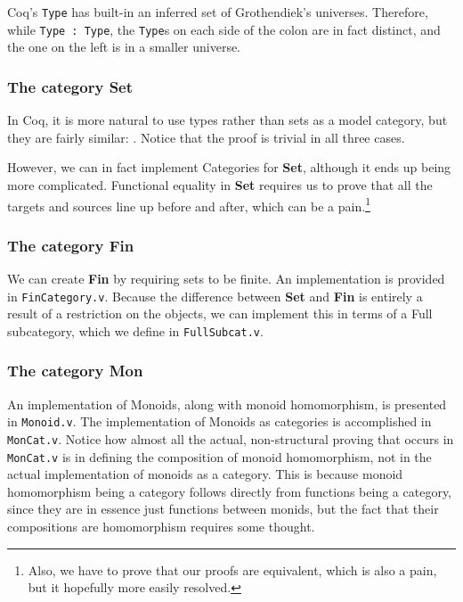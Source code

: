 \documentclass[12pt,twocolumn,oneside]{book}
\begin{document}
Coq's \texttt{Type} has built-in an inferred set of Grothendiek's universes. Therefore,
while \texttt{Type : Type}, the \texttt{Type}s on each side of the colon are in fact
distinct, and the one on the left is in a smaller universe.

\subsubsection{The category \textbf{Set}}

In Coq, it is more natural to use types rather than sets as a model category, but
they are fairly similar: . Notice that the proof
is trivial in all three cases.

However, we can in fact implement Categories for \textbf{Set}, although it ends
up being more complicated. Functional equality in \textbf{Set} requires us to prove
that all the targets and sources line up before and after, which can be a pain.\footnote{
Also, we have to prove that our proofs are equivalent, which is also a pain, but
it hopefully more easily resolved.}

\subsubsection{The category \textbf{Fin}}

We can create \textbf{Fin} by requiring sets to be finite. An implementation is
provided in \texttt{FinCategory.v}. Because the difference between \textbf{Set}
and \textbf{Fin} is entirely a result of a restriction on the objects, we can implement
this in terms of a Full subcategory, which we define in \texttt{FullSubcat.v}.

\subsubsection{The category \textbf{Mon}}

An implementation of Monoids, along with monoid homomorphism, is presented in
\texttt{Monoid.v}. The implementation of Monoids as categories is accomplished
in \texttt{MonCat.v}. Notice how almost all the actual, non-structural proving
that occurs in \texttt{MonCat.v} is in defining the composition of monoid
homomorphism, not in the actual implementation of monoids as a category. This is
because monoid homomorphism being a category follows directly from functions being
a category, since they are in essence just functions between monids, but the fact
that their compositions are homomorphism requires some thought.
\end{document}
